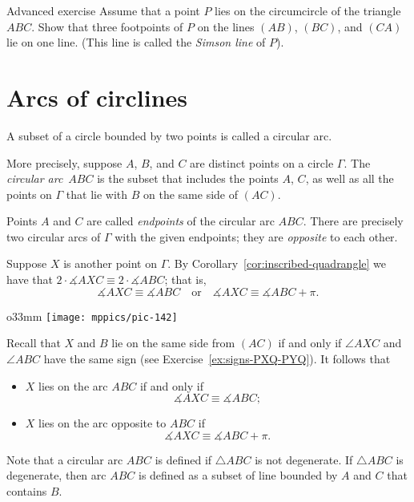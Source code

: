 \begin{thm}{Advanced exercise}\label{ex:simson}
Assume that a point $P$ lies on the circumcircle of the triangle $ABC$.
Show that three footpoints of $P$ on the lines $(AB)$, $(BC)$, and $(CA)$ lie on one line.
(This line is called the \emph{Simson line} of $P$).
\end{thm}

\section{Arcs of circlines}

A subset of a circle bounded by two points is called a circular arc.

More precisely,
suppose $A$, $B$, and $C$ are distinct points on a circle $\Gamma$.
The \emph{circular arc}~$ABC$ is the subset that includes the points $A$, $C$,
as well as all the points on $\Gamma$ that lie with $B$ on the same side of $(AC)$.

Points $A$ and $C$ are called 
\emph{endpoints} of the circular arc $ABC$. 
There are precisely two circular arcs of $\Gamma$ with the given endpoints; they are \emph{opposite} to each other.

Suppose $X$ is another point on $\Gamma$.
By Corollary~\ref{cor:inscribed-quadrangle} we have
that $2\cdot\measuredangle AXC\equiv 2\cdot\measuredangle ABC$;
that is,
\[\measuredangle AXC\equiv\measuredangle ABC
\quad\text{or}\quad
\measuredangle AXC\equiv\measuredangle ABC+\pi.\]

\begin{wrapfigure}{o}{33mm}
\vskip-2mm
\centering
\texttt{[image: mppics/pic-142]}
\end{wrapfigure}

Recall that $X$ and $B$ lie on the same side from $(AC)$ if and only if $\angle AXC$ and $\angle ABC$ have the same sign (see Exercise~\ref{ex:signs-PXQ-PYQ}).
It follows that 
\begin{itemize}
\item $X$ lies on the arc $ABC$ if and only if 
\[\measuredangle AXC\equiv\measuredangle ABC;\]
\item $X$ lies on the arc opposite to $ABC$ if 
\[\measuredangle AXC\equiv\measuredangle ABC+\pi.\]
\end{itemize}

Note that a circular arc $ABC$ is defined if $\triangle ABC$ is not degenerate.
If $\triangle ABC$ is degenerate, then arc $ABC$ is defined as a subset of line bounded by $A$ and $C$ that contains $B$.


